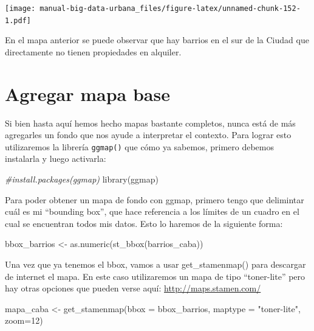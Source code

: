 \documentclass[
  spanish,
]{book}
\newenvironment{Shaded}{\begin{snugshade}}{\end{snugshade}}
\newcommand{\AttributeTok}[1]{\textcolor[rgb]{0.77,0.63,0.00}{#1}}
\newcommand{\CommentTok}[1]{\textcolor[rgb]{0.56,0.35,0.01}{\textit{#1}}}
\newcommand{\DecValTok}[1]{\textcolor[rgb]{0.00,0.00,0.81}{#1}}
\newcommand{\FunctionTok}[1]{\textcolor[rgb]{0.00,0.00,0.00}{#1}}
\newcommand{\NormalTok}[1]{#1}
\newcommand{\OtherTok}[1]{\textcolor[rgb]{0.56,0.35,0.01}{#1}}
\newcommand{\StringTok}[1]{\textcolor[rgb]{0.31,0.60,0.02}{#1}}
\begin{document}
\texttt{[image: manual-big-data-urbana\_files/figure-latex/unnamed-chunk-152-1.pdf]}

En el mapa anterior se puede observar que hay barrios en el sur de la Ciudad que directamente no tienen propiedades en alquiler.

\hypertarget{agregar-mapa-base}{%
\section{Agregar mapa base}\label{agregar-mapa-base}}

Si bien hasta aquí hemos hecho mapas bastante completos, nunca está de más agregarles un fondo que nos ayude a interpretar el contexto. Para lograr esto utilizaremos la librería \texttt{ggmap()} que cómo ya sabemos, primero debemos instalarla y luego activarla:

\begin{Shaded}
\begin{Highlighting}[]
\CommentTok{\#install.packages(ggmap)}
\FunctionTok{library}\NormalTok{(ggmap)}
\end{Highlighting}
\end{Shaded}

Para poder obtener un mapa de fondo con ggmap, primero tengo que delimintar cuál es mi ``bounding box'', que hace referencia a los límites de un cuadro en el cual se encuentran todos mis datos. Esto lo haremos de la siguiente forma:

\begin{Shaded}
\begin{Highlighting}[]
\NormalTok{bbox\_barrios }\OtherTok{\textless{}{-}} \FunctionTok{as.numeric}\NormalTok{(}\FunctionTok{st\_bbox}\NormalTok{(barrios\_caba))}
\end{Highlighting}
\end{Shaded}

Una vez que ya tenemos el bbox, vamos a usar get\_stamenmap() para descargar de internet el mapa. En este caso utilizaremos un mapa de tipo ``toner-lite'' pero hay otras opciones que pueden verse aquí: \url{http://maps.stamen.com/}

\begin{Shaded}
\begin{Highlighting}[]
\NormalTok{mapa\_caba }\OtherTok{\textless{}{-}} \FunctionTok{get\_stamenmap}\NormalTok{(}\AttributeTok{bbox =}\NormalTok{ bbox\_barrios,}
                      \AttributeTok{maptype =} \StringTok{"toner{-}lite"}\NormalTok{,}
                      \AttributeTok{zoom=}\DecValTok{12}\NormalTok{)}
\end{Highlighting}
\end{Shaded}
\end{document}
